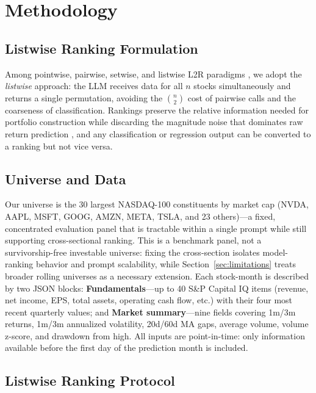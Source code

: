 \section{Methodology}

\subsection{Listwise Ranking Formulation}

Among pointwise, pairwise, setwise, and listwise L2R paradigms \citep{qin2024pairwise,zhuang2024setwise,ren2025selfcalibrated}, we adopt the \emph{listwise} approach: the LLM receives data for all $n$ stocks simultaneously and returns a single permutation, avoiding the $\binom{n}{2}$ cost of pairwise calls and the coarseness of classification.
Rankings preserve the relative information needed for portfolio construction while discarding the magnitude noise that dominates raw return prediction \citep{gu2020empirical}, and any classification or regression output can be converted to a ranking but not vice versa.

\subsection{Universe and Data}

Our universe is the 30 largest NASDAQ-100 constituents by market cap (NVDA, AAPL, MSFT, GOOG, AMZN, META, TSLA, and 23 others)---a fixed, concentrated evaluation panel that is tractable within a single prompt while still supporting cross-sectional ranking.
This is a benchmark panel, not a survivorship-free investable universe: fixing the cross-section isolates model-ranking behavior and prompt scalability, while Section~\ref{sec:limitations} treats broader rolling universes as a necessary extension.
Each stock-month is described by two JSON blocks:
\textbf{Fundamentals}---up to 40 S\&P Capital IQ items (revenue, net income, EPS, total assets, operating cash flow, etc.) with their four most recent quarterly values; and
\textbf{Market summary}---nine fields covering 1m/3m returns, 1m/3m annualized volatility, 20d/60d MA gaps, average volume, volume z-score, and drawdown from high.
All inputs are point-in-time: only information available before the first day of the prediction month is included.

\subsection{Listwise Ranking Protocol}

